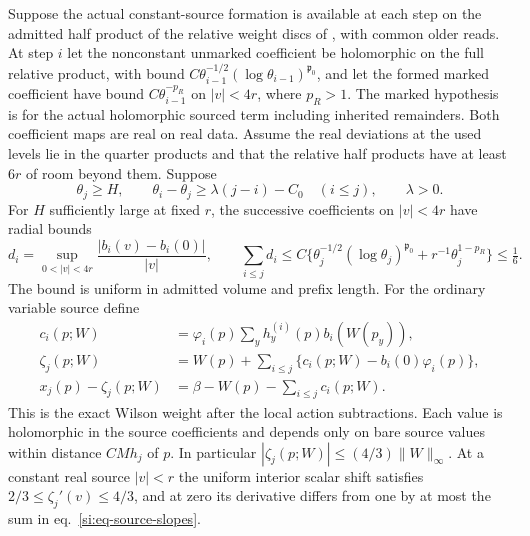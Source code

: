 \documentclass[11pt,letterpaper,reqno]{amsart}
\makeatletter
\numberwithin{equation}{section}
\renewcommand{\eqref}[1]{\textup{eq.~\ref{#1}}}
\theoremstyle{definition}
\newcommand{\ms@minorstart}{%
  \pushQED{\qed}\renewcommand{\qedsymbol}{$\blacksquare$}}
\newenvironment{proposition}[1][]{\ms@minorstart\ms@proposition[#1]}
  {\popQED\endms@proposition}
\theoremstyle{remark}
\makeatother
\begin{document}
\begin{samepage}
\begin{proposition}[Scalar shifts and their source range]
\label{si:prop-source-profiles}
Suppose the actual constant-source formation is available at each
step on the admitted half product of the relative weight discs of
\cite{RT}, with common older reads. At step $i$ let the nonconstant
unmarked coefficient be holomorphic on the full relative product,
with bound $C\theta_{i-1}^{-1/2}(\log\theta_{i-1})^{\mathfrak p_0}$,
and let the formed marked coefficient have bound
$C\theta_{i-1}^{-p_R}$ on $|v|<4r$, where $p_R>1$. The marked
hypothesis is for the actual holomorphic sourced term including inherited
remainders. Both coefficient maps are real on real data.
Assume the real deviations at the used levels lie in
the quarter products and that the relative half products have
at least $6r$ of room beyond them. Suppose
\[
 \theta_j\ge H,\qquad
 \theta_i-\theta_j\ge\lambda(j-i)-C_0\quad(i\le j),
 \qquad\lambda>0.
\]
For $H$ sufficiently large at fixed $r$, the successive coefficients
on $|v|<4r$ have radial bounds
\begin{equation}\label{si:eq-source-slopes}
 d_i=\sup_{0<|v|<4r}\frac{|b_i(v)-b_i(0)|}{|v|},\qquad
 \sum_{i\le j}d_i\le C\{\theta_j^{-1/2}(\log\theta_j)^{\mathfrak p_0}
                           +r^{-1}\theta_j^{1-p_R}\}\le\tfrac16.
\end{equation}
The bound is uniform in admitted volume and prefix length. For the
ordinary variable source define
\begin{equation}\label{si:eq-running-shift}
 \begin{split}
 c_i(p;W)&=\varphi_i(p)\sum_y h_y^{(i)}(p)b_i(W(p_y)),\\
 \zeta_j(p;W)&=W(p)+\sum_{i\le j}\{c_i(p;W)-b_i(0)\varphi_i(p)\},\\
 x_j(p)-\zeta_j(p;W)&=\beta-W(p)-\sum_{i\le j}c_i(p;W).
 \end{split}
\end{equation}
This is the exact Wilson weight after the local action subtractions.
Each value is holomorphic in the source coefficients and depends
only on bare source values within distance $CMh_j$ of $p$. In
particular $|\zeta_j(p;W)|\le(4/3)\|W\|_\infty$. At a constant
real source $|v|<r$ the uniform interior scalar shift satisfies
$2/3\le\zeta_j'(v)\le4/3$, and at zero its derivative differs from
one by at most the sum in \eqref{si:eq-source-slopes}.
\end{proposition}
\end{samepage}
\end{document}
